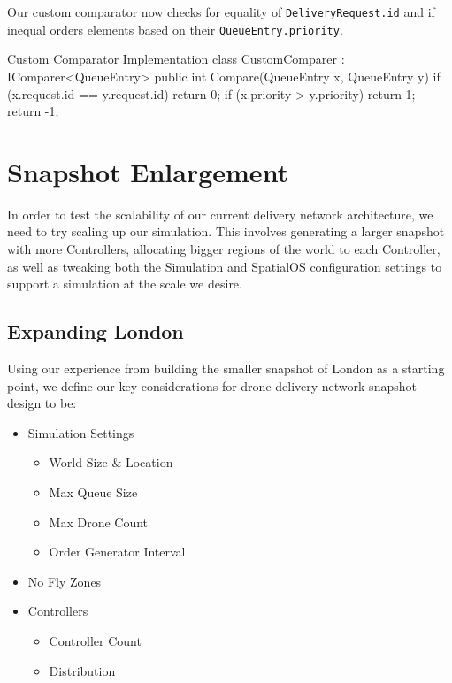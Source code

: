 \documentclass[a4paper,11pt,titlepage]{report}
\begin{document}
Our custom comparator now checks for equality of \texttt{DeliveryRequest.id} and if inequal orders elements based on their \texttt{QueueEntry.priority}.\\

\begin{sexylisting}[colback=white]{Custom Comparator Implementation}
class CustomComparer : IComparer<QueueEntry>
{
  public int Compare(QueueEntry x, QueueEntry y)
  {
    if (x.request.id == y.request.id)
    {
      return 0;
    }
    if (x.priority > y.priority)
    {
      return 1;
    }
    return -1;
  }
}
\end{sexylisting}

\newpage
\chapter{Snapshot Enlargement}
In order to test the scalability of our current delivery network architecture, we need to try scaling up our simulation. This involves generating a larger snapshot with more Controllers, allocating bigger regions of the world to each Controller, as well as tweaking both the Simulation and SpatialOS configuration settings to support a simulation at the scale we desire.

\section{Expanding London}
Using our experience from building the smaller snapshot of London as a starting point, we define our key considerations for drone delivery network snapshot design to be:
\begin{itemize}
  \item Simulation Settings
  \begin{multicols}{2}
    \begin{itemize}
      \item World Size \& Location
      \item Max Queue Size
      \item Max Drone Count
      \item Order Generator Interval
    \end{itemize}
  \end{multicols}
  \item No Fly Zones
  \item Controllers
  \begin{multicols}{2}
    \begin{itemize}
      \item Controller Count
      \item Distribution
    \end{itemize}
  \end{multicols}
\end{itemize}
\end{document}
